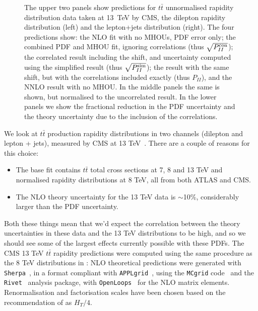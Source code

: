 \begin{figure}[H]
  \vspace{-0.55cm}
  \caption{The upper two panels show predictions for $t\bar{t}$ unnormalised rapidity distribution data taken at 13~TeV by CMS, the dilepton rapidity distribution \cite{Sirunyan:2018ucr} (left) and the lepton+jets distribution \cite{Sirunyan:2018wem} (right). The four predictions show: the NLO fit with no MHOUs, PDF error only; the combined PDF and MHOU fit, ignoring correlations (thus $\sqrt{P_{II}^{\rm con}}$); the correlated result including the shift, and uncertainty computed using the simplified result (thus $\sqrt{P_{II}^{\rm sim}}$); the result with the same shift, but with the correlations included exactly (thus $P_{II}$), and the NNLO result with no MHOU. In the middle panels the same is shown, but normalised to the uncorrelated result. In the lower panels we show the fractional reduction in the PDF uncertainty and the theory uncertainty due to the inclusion of the correlations.}
  \label{fig:CMSttbar}
\end{figure}

We look at $t\bar{t}$ production rapidity distributions in two channels (dilepton and lepton + jets), measured by CMS at 13 TeV~\cite{Sirunyan:2018ucr,Sirunyan:2018wem}. There are a couple of reasons for this choice:
\begin{itemize}
\item The base fit contains $t\bar{t}$ total cross sections at 7, 8 and 13 TeV and normalised rapidity distributions at 8 TeV, all from both ATLAS and CMS.
\item The NLO theory uncertainty for the 13 TeV data is $\sim$10\%, considerably larger than the PDF uncertainty.
\end{itemize}
Both these things mean that we'd expect the correlation between the theory uncertainties in these data and the 13 TeV distributions to be high, and so we should see some of the largest effects currently possible with these PDFs. The CMS 13 TeV $t\bar{t}$ rapidity predictions were computed using the same procedure as the 8 TeV distributions in \cite{Ball:2017nwa}: NLO theoretical predictions were generated with {\tt Sherpa}~\cite{Gleisberg:2008ta}, in a format compliant with {\tt APPLgrid}~\cite{Carli:2010rw}, using the {\tt MCgrid} 
code~\cite{DelDebbio:2013kxa} and the {\tt Rivet}~\cite{Buckley:2010ar} analysis package, with {\tt OpenLoops}~\cite{Cascioli:2011va} for the NLO 
matrix elements. Renormalisation and factorisation scales have been chosen based on the recommendation of \cite{Czakon:2016dgf} as $H_T/4$.

